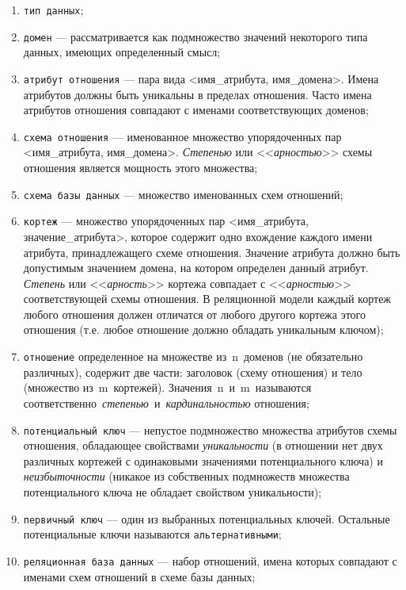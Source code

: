 \begin{enumerate}[label={\arabic*)}]
	\item \texttt{тип данных};
	\item \texttt{домен} --- рассматривается как подмножество значений некоторого типа данных, имеющих определенный смысл;
	\item \texttt{атрибут отношения} --- пара вида <имя\_атрибута, имя\_домена>. Имена атрибутов должны быть уникальны в
	пределах отношения. Часто имена атрибутов отношения совпадают с именами соответствующих доменов;
	\item \texttt{схема отношения} --- именованное множество упорядоченных пар <имя\_атрибута, имя\_домена>. \textit{Степенью} или
	<<\textit{арностью}>> схемы отношения является мощность этого множества;
	\item \texttt{схема базы данных} --- множество именованных схем отношений;
	\item \texttt{кортеж} --- множество упорядоченных пар <имя\_атрибута,
	значение\_атрибута>, которое содержит одно вхождение каждого имени атрибута, принадлежащего схеме отношения.
	Значение атрибута должно быть допустимым значением домена, на котором определен данный атрибут. 
	\textit{Степень} или <<\textit{арность}>> кортежа совпадает с <<\textit{арностью}>> соответствующей схемы отношения. 
	В реляционной модели каждый кортеж любого отношения должен отличатся от любого другого кортежа этого отношения (т.е. любое отношение должно обладать уникальным ключом);
	\item \texttt{отношение} определенное на множестве из n доменов (не обязательно различных), содержит две части: заголовок (схему отношения) и тело (множество из m кортежей). Значения n и m называются соответственно \textit{степенью} и \textit{кардинальностью} отношения;
	\item \texttt{потенциальный ключ} --- непустое подмножество множества атрибутов схемы отношения, обладающее свойствами \textit{уникальности} (в отношении нет двух различных кортежей с одинаковыми
	значениями потенциального ключа) и \textit{неизбыточности} (никакое из собственных подмножеств множества потенциального ключа не обладает свойством уникальности);
	\item \texttt{первичный ключ} --- один из выбранных потенциальных ключей. Остальные потенциальные ключи называются \texttt{альтернативными};
	\item \texttt{реляционная база данных} --- набор отношений, имена которых совпадают с именами схем отношений в схеме базы данных;
\end{enumerate}

